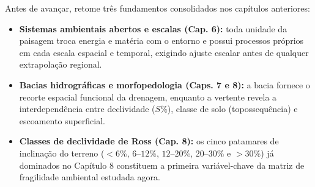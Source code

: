 \begin{capRevisao}
Antes de avançar, retome três fundamentos consolidados nos capítulos anteriores:
\begin{itemize}[leftmargin=1.5em, itemsep=2pt]
  \item \textbf{Sistemas ambientais abertos e escalas (Cap. 6):} toda unidade da paisagem troca energia e matéria com o entorno e possui processos próprios em cada escala espacial e temporal, exigindo ajuste escalar antes de qualquer extrapolação regional.
  \item \textbf{Bacias hidrográficas e morfopedologia (Caps. 7 e 8):} a bacia fornece o recorte espacial funcional da drenagem, enquanto a vertente revela a interdependência entre declividade ($S\%$), classe de solo (topossequência) e escoamento superficial.
  \item \textbf{Classes de declividade de Ross (Cap. 8):} os cinco patamares de inclinação do terreno ($<6\%$, $6\text{--}12\%$, $12\text{--}20\%$, $20\text{--}30\%$ e $>30\%$) já dominados no Capítulo 8 constituem a primeira variável-chave da matriz de fragilidade ambiental estudada agora.
\end{itemize}
\end{capRevisao}


